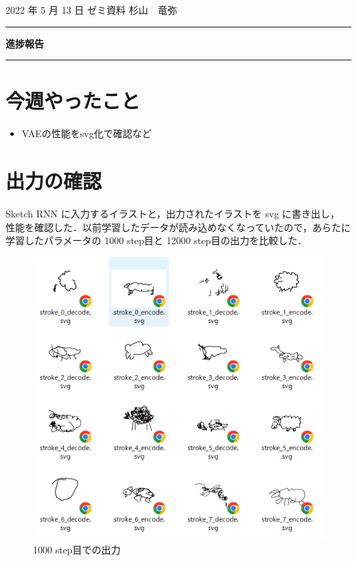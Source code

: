 \documentclass[onecolumn]{ujarticle}   %
\begin{document}

		\noindent
		\hspace{1em}
		2022 年 5 月 13 日
		ゼミ資料
		\hfill
		杉山　竜弥
		\vspace{2mm}

		\hrule
		\begin{center}
			{\Large \bf 進捗報告}
		\end{center}
		\hrule
		\vspace{9mm}


\section{今週やったこと}
\begin{itemize}
  \item VAEの性能をsvg化で確認など
\end{itemize}

\section{出力の確認}
Sketch RNN に入力するイラストと，出力されたイラストを svg に書き出し，
性能を確認した．以前学習したデータが読み込めなくなっていたので，あらたに学習したパラメータの 1000 step目と 12000 step目の出力を比較した．

  \begin{figure}[h]
    \begin{center}
      \includegraphics[clip,width=120mm]{ss1000.png}
      \caption{1000 step目での出力}
      \label{fig:result1}
    \end{center}
  \end{figure}
\end{document}
